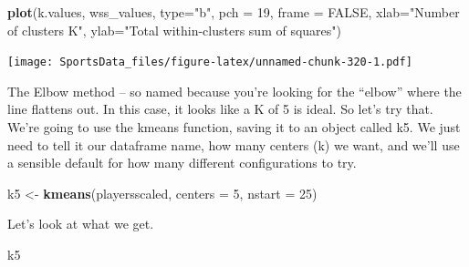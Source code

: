 \documentclass[
]{book}
\newenvironment{Shaded}{\begin{snugshade}}{\end{snugshade}}
\newcommand{\DataTypeTok}[1]{\textcolor[rgb]{0.13,0.29,0.53}{#1}}
\newcommand{\DecValTok}[1]{\textcolor[rgb]{0.00,0.00,0.81}{#1}}
\newcommand{\KeywordTok}[1]{\textcolor[rgb]{0.13,0.29,0.53}{\textbf{#1}}}
\newcommand{\NormalTok}[1]{#1}
\newcommand{\OtherTok}[1]{\textcolor[rgb]{0.56,0.35,0.01}{#1}}
\newcommand{\StringTok}[1]{\textcolor[rgb]{0.31,0.60,0.02}{#1}}
\begin{document}
\begin{Shaded}
\begin{Highlighting}[]
\KeywordTok{plot}\NormalTok{(k.values, wss_values,}
       \DataTypeTok{type=}\StringTok{"b"}\NormalTok{, }\DataTypeTok{pch =} \DecValTok{19}\NormalTok{, }\DataTypeTok{frame =} \OtherTok{FALSE}\NormalTok{, }
       \DataTypeTok{xlab=}\StringTok{"Number of clusters K"}\NormalTok{,}
       \DataTypeTok{ylab=}\StringTok{"Total within-clusters sum of squares"}\NormalTok{)}
\end{Highlighting}
\end{Shaded}

\texttt{[image: SportsData\_files/figure-latex/unnamed-chunk-320-1.pdf]}

The Elbow method -- so named because you're looking for the ``elbow'' where the line flattens out. In this case, it looks like a K of 5 is ideal. So let's try that. We're going to use the kmeans function, saving it to an object called k5. We just need to tell it our dataframe name, how many centers (k) we want, and we'll use a sensible default for how many different configurations to try.

\begin{Shaded}
\begin{Highlighting}[]
\NormalTok{k5 <-}\StringTok{ }\KeywordTok{kmeans}\NormalTok{(playersscaled, }\DataTypeTok{centers =} \DecValTok{5}\NormalTok{, }\DataTypeTok{nstart =} \DecValTok{25}\NormalTok{)}
\end{Highlighting}
\end{Shaded}

Let's look at what we get.

\begin{Shaded}
\begin{Highlighting}[]
\NormalTok{k5}
\end{Highlighting}
\end{Shaded}
\end{document}
